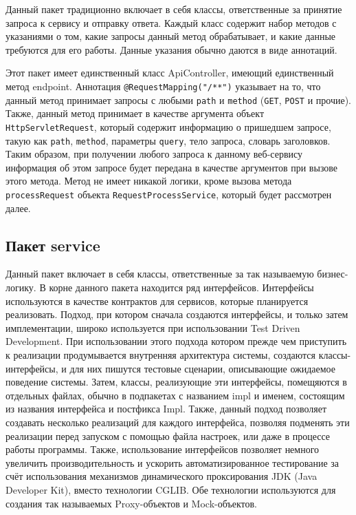 Данный пакет традиционно включает в себя классы, ответственные за принятие запроса к сервису и отправку ответа.
Каждый класс содержит набор методов с указаниями о том, какие запросы данный метод обрабатывает, и какие данные требуются для его работы.
Данные указания обычно даются в виде аннотаций.

Этот пакет имеет единственный класс ApiController, имеющий единственный метод endpoint.
Аннотация \texttt{@RequestMapping("/**")} указывает на то, что данный метод принимает запросы с любыми \texttt{path} и \texttt{method} (\texttt{GET}, \texttt{POST} и прочие).
Также, данный метод принимает в качестве аргумента объект \texttt{HttpServletRequest}, который содержит информацию о пришедшем запросе, такую как \texttt{path}, \texttt{method}, параметры \texttt{query}, тело запроса, словарь заголовков.
Таким образом, при получении любого запроса к данному веб-сервису информация об этом запросе будет передана в качестве аргументов при вызове этого метода.
Метод не имеет никакой логики, кроме вызова метода \texttt{processRequest} объекта \texttt{RequestProcessService}, который будет рассмотрен далее.

\subsection{Пакет service}\label{subsec:package-service}

Данный пакет включает в себя классы, ответственные за так называемую бизнес-логику.
В корне данного пакета находится ряд интерфейсов.
Интерфейсы используются в качестве контрактов для сервисов, которые планируется реализовать.
Подход, при котором сначала создаются интерфейсы, и только затем имплементации, широко используется при использовании Test Driven Development.
При использовании этого подхода котором прежде чем приступить к реализации продумывается внутренняя архитектура системы, создаются классы-интерфейсы, и для них пишутся тестовые сценарии, описывающие ожидаемое поведение системы.
Затем, классы, реализующие эти интерфейсы, помещяются в отдельных файлах, обычно в подпакетах с названием impl и именем, состоящим из названия интерфейса и постфикса Impl.
Также, данный подход позволяет создавать несколько реализаций для каждого интерфейса, позволяя подменять эти реализации перед запуском с помощью файла настроек, или даже в процессе работы программы.
Также, использование интерфейсов позволяет немного увеличить производительность и ускорить автоматизированное тестирование за счёт использования механизмов динамического проксирования JDK (Java Developer Kit), вместо технологии CGLIB\@.
Обе технологии используются для создания так называемых Proxy-объектов и Mock-объектов.

